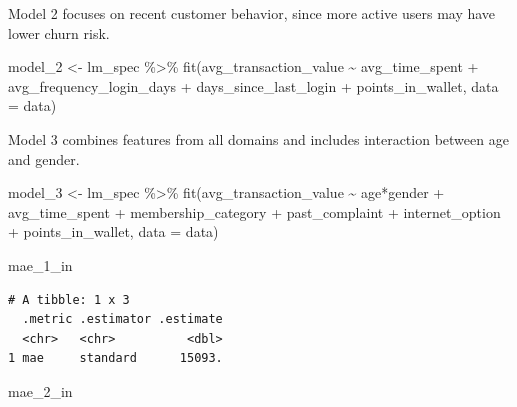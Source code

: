 \documentclass[
  letterpaper,
  DIV=11,
  numbers=noendperiod]{scrartcl}
\newenvironment{Shaded}{\begin{snugshade}}{\end{snugshade}}
\newcommand{\AttributeTok}[1]{\textcolor[rgb]{0.40,0.45,0.13}{#1}}
\newcommand{\FunctionTok}[1]{\textcolor[rgb]{0.28,0.35,0.67}{#1}}
\newcommand{\NormalTok}[1]{\textcolor[rgb]{0.00,0.23,0.31}{#1}}
\newcommand{\OtherTok}[1]{\textcolor[rgb]{0.00,0.23,0.31}{#1}}
\newcommand{\SpecialCharTok}[1]{\textcolor[rgb]{0.37,0.37,0.37}{#1}}
\begin{document}
Model 2 focuses on recent customer behavior, since more active users may
have lower churn risk.

\begin{Shaded}
\begin{Highlighting}[]
\NormalTok{model\_2 }\OtherTok{\textless{}{-}}\NormalTok{ lm\_spec }\SpecialCharTok{\%\textgreater{}\%} \FunctionTok{fit}\NormalTok{(avg\_transaction\_value }\SpecialCharTok{\textasciitilde{}}\NormalTok{ avg\_time\_spent }\SpecialCharTok{+}\NormalTok{ avg\_frequency\_login\_days }\SpecialCharTok{+}\NormalTok{ days\_since\_last\_login }\SpecialCharTok{+}\NormalTok{ points\_in\_wallet, }\AttributeTok{data =}\NormalTok{ data)}
\end{Highlighting}
\end{Shaded}

Model 3 combines features from all domains and includes interaction
between age and gender.

\begin{Shaded}
\begin{Highlighting}[]
\NormalTok{model\_3 }\OtherTok{\textless{}{-}}\NormalTok{ lm\_spec }\SpecialCharTok{\%\textgreater{}\%} \FunctionTok{fit}\NormalTok{(avg\_transaction\_value }\SpecialCharTok{\textasciitilde{}}\NormalTok{ age}\SpecialCharTok{*}\NormalTok{gender }\SpecialCharTok{+}\NormalTok{ avg\_time\_spent }\SpecialCharTok{+}\NormalTok{ membership\_category }\SpecialCharTok{+}\NormalTok{ past\_complaint }\SpecialCharTok{+}\NormalTok{ internet\_option }\SpecialCharTok{+}\NormalTok{ points\_in\_wallet, }\AttributeTok{data =}\NormalTok{ data)}
\end{Highlighting}
\end{Shaded}

\begin{Shaded}
\begin{Highlighting}[]
\NormalTok{mae\_1\_in}
\end{Highlighting}
\end{Shaded}

\begin{verbatim}
# A tibble: 1 x 3
  .metric .estimator .estimate
  <chr>   <chr>          <dbl>
1 mae     standard      15093.
\end{verbatim}

\begin{Shaded}
\begin{Highlighting}[]
\NormalTok{mae\_2\_in}
\end{Highlighting}
\end{Shaded}
\end{document}
